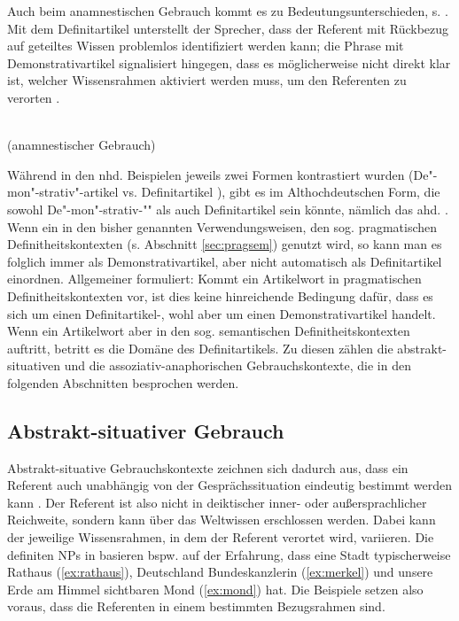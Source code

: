Auch beim anamnestischen Gebrauch kommt es zu Bedeutungsunterschieden, s. . Mit dem Definitartikel unterstellt der Sprecher,  dass der Referent mit Rückbezug auf geteiltes Wissen problemlos identifiziert werden kann; die Phrase mit Demonstrativartikel signalisiert hingegen, dass es möglicherweise nicht direkt klar ist, welcher Wissensrahmen aktiviert werden muss, um den Referenten zu verorten \parencite[79-80]{Bisle-Muller1991}. 
 
\begin{exe}
	\ex \label{ex:anamndef}  \\ (anamnestischer Gebrauch)
\end{exe}
 
Während in den nhd. Beispielen jeweils zwei Formen kontrastiert wurden (De"-mon"-strativ"-artikel  vs. Definitartikel ), gibt es im Althochdeutschen  Form, die sowohl De"-mon"-strativ-"" als auch Definitartikel sein könnte, nämlich das ahd. . 
Wenn ein   in den bisher genannten Verwendungsweisen, den sog. pragmatischen Definitheitskontexten (s. Abschnitt \ref{sec:pragsem}) genutzt wird, so kann man es folglich immer als Demonstrativartikel, aber nicht automatisch als Definitartikel einordnen. Allgemeiner formuliert: Kommt ein Artikelwort in pragmatischen Definitheitskontexten vor, ist dies keine  hinreichende Bedingung dafür, dass es sich um einen Definitartikel-, wohl aber um einen Demonstrativartikel handelt. Wenn ein Artikelwort aber in den sog. semantischen Definitheitskontexten auftritt, betritt es die Domäne des Definitartikels. Zu diesen zählen die abstrakt-situativen und die assoziativ-anaphorischen Gebrauchskontexte, die in den folgenden Abschnitten besprochen werden. 



\subsection{Abstrakt-situativer Gebrauch}\label{sec:abst-sit}

Abstrakt-situative Gebrauchskontexte zeichnen sich dadurch aus, dass ein Referent auch unabhängig von der Gesprächssituation eindeutig bestimmt werden kann \parencite[daher auch , vgl.][115]{Hawkins1978}. Der  Referent ist also nicht in deiktischer inner- oder außersprachlicher Reichweite, sondern kann über das Weltwissen erschlossen werden. Dabei kann der jeweilige Wissensrahmen, in dem der Referent verortet wird, variieren. Die definiten NPs in  basieren bspw. auf der Erfahrung, dass eine Stadt typischerweise  Rathaus (\ref{ex:rathaus}),  Deutschland   Bundeskanzlerin (\ref{ex:merkel})  und unsere Erde  am Himmel sichtbaren Mond (\ref{ex:mond}) hat. Die Beispiele setzen also voraus, dass die Referenten in einem bestimmten Bezugsrahmen  \parencite{Russell2006} sind. 

